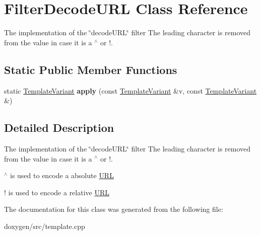 \hypertarget{class_filter_decode_u_r_l}{}\section{Filter\+Decode\+U\+RL Class Reference}
\label{class_filter_decode_u_r_l}


The implementation of the \char`\"{}decode\+U\+R\+L\char`\"{} filter The leading character is removed from the value in case it is a $^\wedge$ or !.  


\subsection*{Static Public Member Functions}
\begin{DoxyCompactItemize}
\item 
\mbox{\label{class_filter_decode_u_r_l_a9e1f76d9768c93201cfc11957a294739}} 
static \mbox{\hyperlink{class_template_variant}{Template\+Variant}} {\bfseries apply} (const \mbox{\hyperlink{class_template_variant}{Template\+Variant}} \&v, const \mbox{\hyperlink{class_template_variant}{Template\+Variant}} \&)
\end{DoxyCompactItemize}


\subsection{Detailed Description}
The implementation of the \char`\"{}decode\+U\+R\+L\char`\"{} filter The leading character is removed from the value in case it is a $^\wedge$ or !. 


\begin{DoxyItemize}
\item $^\wedge$ is used to encode a absolute \mbox{\hyperlink{struct_u_r_l}{U\+RL}}
\item ! is used to encode a relative \mbox{\hyperlink{struct_u_r_l}{U\+RL}} 
\end{DoxyItemize}

The documentation for this class was generated from the following file\+:\begin{DoxyCompactItemize}
\item 
doxygen/src/template.\+cpp\end{DoxyCompactItemize}
